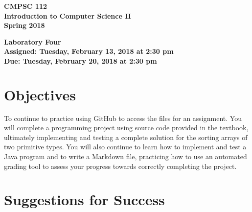 \documentclass[11pt]{article}
\newcommand{\assignmentduedate}{February 20}
\newcommand{\assignmentassignedate}{February 13}
\newcommand{\assignmentnumber}{Four}
\newcommand{\labyear}{2018}
\newcommand{\labday}{Tuesday}
\newcommand{\labtime}{2:30 pm}
\newcommand{\assigneddate}{Assigned: \labday, \assignmentassignedate, \labyear{} at \labtime{}}
\newcommand{\duedate}{Due: \labday, \assignmentduedate, \labyear{} at \labtime{}}
\newcommand{\labtitle}[1]
{
  \begin{center}
    \begin{center}
      \bf
      CMPSC 112\\Introduction to Computer Science II\\
      Spring 2018\\
      \medskip
    \end{center}
    \bf
    #1
  \end{center}
}
\begin{document}
\thispagestyle{empty}

\labtitle{Laboratory \assignmentnumber{} \\ \assigneddate{} \\ \duedate{}}

\section*{Objectives}

To continue to practice using GitHub to access the files for an assignment. You
will complete a programming project using source code provided in the textbook,
ultimately implementing and testing a complete solution for the sorting arrays
of two primitive types. You will also continue to learn how to implement and
test a Java program and to write a Markdown file, practicing how to use an
automated grading tool to assess your progress towards correctly completing the
project.

\section*{Suggestions for Success}
\end{document}
